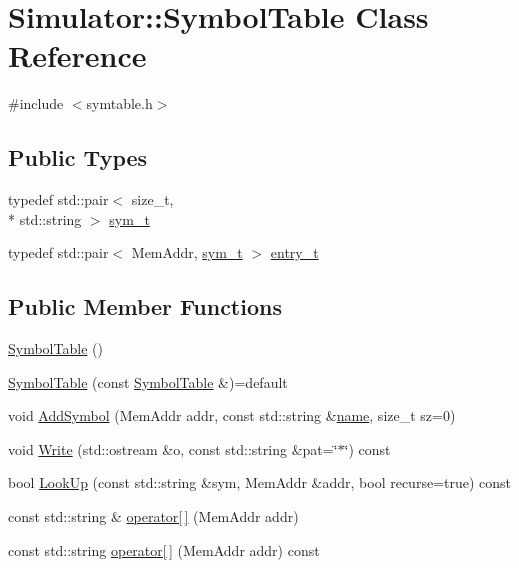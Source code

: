 \hypertarget{class_simulator_1_1_symbol_table}{\section{Simulator\+:\+:Symbol\+Table Class Reference}
\label{class_simulator_1_1_symbol_table}
}


{\ttfamily \#include $<$symtable.\+h$>$}

\subsection*{Public Types}
\begin{DoxyCompactItemize}
\item 
typedef std\+::pair$<$ size\+\_\+t, \\*
std\+::string $>$ \hyperlink{class_simulator_1_1_symbol_table_a4e34769946eecc536f237c68a92c3744}{sym\+\_\+t}
\item 
typedef std\+::pair$<$ Mem\+Addr, \hyperlink{class_simulator_1_1_symbol_table_a4e34769946eecc536f237c68a92c3744}{sym\+\_\+t} $>$ \hyperlink{class_simulator_1_1_symbol_table_a91fddb0fa183ac55b5c501629b36478c}{entry\+\_\+t}
\end{DoxyCompactItemize}
\subsection*{Public Member Functions}
\begin{DoxyCompactItemize}
\item 
\hyperlink{class_simulator_1_1_symbol_table_aee916b0a2a54638117315ade24a33cea}{Symbol\+Table} ()
\item 
\hyperlink{class_simulator_1_1_symbol_table_a395ef0e359220ec8e49d948f3b8345b4}{Symbol\+Table} (const \hyperlink{class_simulator_1_1_symbol_table}{Symbol\+Table} \&)=default
\item 
void \hyperlink{class_simulator_1_1_symbol_table_ae396ec10a1f3edfe000f05f3fae948d9}{Add\+Symbol} (Mem\+Addr addr, const std\+::string \&\hyperlink{mtconf_8c_a8f8f80d37794cde9472343e4487ba3eb}{name}, size\+\_\+t sz=0)
\item 
void \hyperlink{class_simulator_1_1_symbol_table_a98f1b1181a26bcc17cb772d299ac4708}{Write} (std\+::ostream \&o, const std\+::string \&pat=\char`\"{}$\ast$\char`\"{}) const 
\item 
bool \hyperlink{class_simulator_1_1_symbol_table_ab6fe4d04d97bc54ec1ff3084b101271a}{Look\+Up} (const std\+::string \&sym, Mem\+Addr \&addr, bool recurse=true) const 
\item 
const std\+::string \& \hyperlink{class_simulator_1_1_symbol_table_af7587b262171796890585fcee5652b0e}{operator\mbox{[}$\,$\mbox{]}} (Mem\+Addr addr)
\item 
const std\+::string \hyperlink{class_simulator_1_1_symbol_table_a61f3545a45d9e89873be1dc837339f82}{operator\mbox{[}$\,$\mbox{]}} (Mem\+Addr addr) const 
\end{DoxyCompactItemize}
